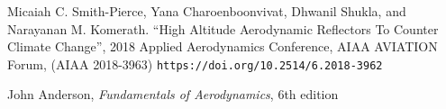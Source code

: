 \documentclass[12pt]{report} %
\begin{document}
\begin{thebibliography}{3}

Micaiah C. Smith-Pierce, Yana Charoenboonvivat, Dhwanil Shukla, and Narayanan M. Komerath. ``High Altitude Aerodynamic Reflectors To
Counter Climate Change'', 2018 Applied Aerodynamics Conference, AIAA AVIATION Forum, (AIAA 2018-3963)
\verb|https://doi.org/10.2514/6.2018-3962|

John Anderson, \textit{Fundamentals of Aerodynamics}, 6th edition

\end{thebibliography}
\end{document}
